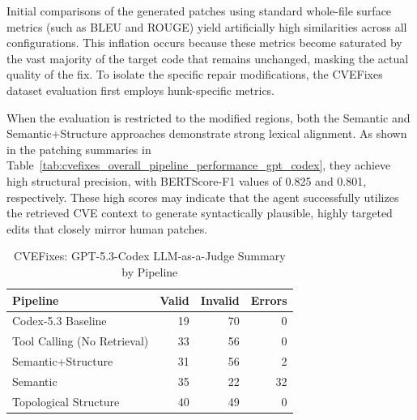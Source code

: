 Initial comparisons of the generated patches using standard whole-file surface metrics (such as BLEU and ROUGE) yield artificially high similarities across all configurations. 
This inflation occurs because these metrics become saturated by the vast majority of the target code that remains unchanged, masking the actual quality of the fix. 
To isolate the specific repair modifications, the CVEFixes dataset evaluation first employs hunk-specific metrics. 

When the evaluation is restricted to the modified regions, both the Semantic and Semantic+Structure approaches demonstrate strong lexical alignment. 
As shown in the patching summaries in Table~\ref{tab:cvefixes_overall_pipeline_performance_gpt_codex}, they achieve high structural precision, with BERTScore-F1 values of 0.825 and 0.801, respectively.
These high scores may indicate that the agent successfully utilizes the retrieved CVE context to generate syntactically plausible, highly targeted edits that closely mirror human patches. 
\begin{table}[h]
  \centering
  \small
  \caption{CVEFixes: GPT-5.3-Codex LLM-as-a-Judge Summary by Pipeline}
  \label{tab:llmjudge_codex53}
  \begin{tabular}{lrrr}
    \toprule
    \textbf{Pipeline} & \textbf{Valid} & \textbf{Invalid} & \textbf{Errors} \\
    \midrule
    Codex-5.3 Baseline  & 19 & 70 & 0 \\
    Tool Calling (No Retrieval)  & 33 & 56 & 0 \\
    Semantic+Structure  & 31 & 56 & 2 \\
    Semantic &  35 & 22 & 32 \\
    Topological Structure & 40 & 49 & 0 \\
    \bottomrule
  \end{tabular}
\end{table}


